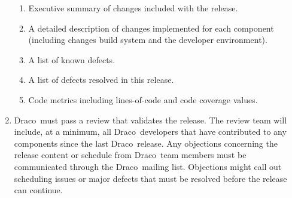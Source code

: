 \documentclass[note]{newmemo}
\newcommand{\draco}{{\normalfont\small\sffamily Draco}}
\begin{document}
\begin{enumerate}
\begin{enumerate}
    \item Executive summary of changes included with the release.
    \item A detailed description of changes implemented for each
      component (including changes build system and the developer
      environment). 
    \item A list of known defects.
    \item A list of defects resolved in this release.
    \item Code metrics including lines-of-code and code coverage
      values.
  \end{enumerate}

\item \draco\ must pass a review that validates the release.  The
  review team will include, at a minimum, all \draco\ developers that
  have contributed to any components since the last \draco\ release.
  Any objections concerning the release content or schedule from
  \draco\ team members must be communicated through the
  \draco\ mailing list.  Objections might call out scheduling issues
  or major defects that must be resolved before the release can
  continue.


\end{enumerate}
\end{document}

